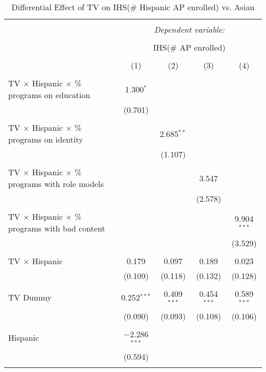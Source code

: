 
\begin{table}[!htbp] \centering 
  \caption{Differential Effect of TV on IHS(\# Hispanic AP enrolled) vs. Asian} 
  \label{} 
\begin{tabular}{@{\extracolsep{-2pt}}lcccc} 
\\[-1.8ex]\hline 
\hline \\[-1.8ex] 
 & \multicolumn{4}{c}{\textit{Dependent variable:}} \\ 
\cline{2-5} 
\\[-1.8ex] & \multicolumn{4}{c}{IHS(\# AP enrolled)} \\ 
\\[-1.8ex] & (1) & (2) & (3) & (4)\\ 
\hline \\[-1.8ex] 
 TV $\times$ Hispanic $\times$ \% programs on education & 1.300$^{*}$ &  &  &  \\ 
  & (0.701) &  &  &  \\ 
  & & & & \\ 
 TV $\times$ Hispanic $\times$ \% programs on identity &  & 2.685$^{**}$ &  &  \\ 
  &  & (1.107) &  &  \\ 
  & & & & \\ 
 TV $\times$ Hispanic $\times$ \% programs with role models &  &  & 3.547 &  \\ 
  &  &  & (2.578) &  \\ 
  & & & & \\ 
 TV $\times$ Hispanic $\times$ \% programs with bad content &  &  &  & 9.904$^{***}$ \\ 
  &  &  &  & (3.529) \\ 
  & & & & \\ 
 TV $\times$ Hispanic & 0.179 & 0.097 & 0.189 & 0.023 \\ 
  & (0.109) & (0.118) & (0.132) & (0.128) \\ 
  & & & & \\ 
 TV Dummy & 0.252$^{***}$ & 0.409$^{***}$ & 0.454$^{***}$ & 0.589$^{***}$ \\ 
  & (0.090) & (0.093) & (0.108) & (0.106) \\ 
  & & & & \\ 
 Hispanic & $-$2.286$^{***}$ &  &  &  \\ 
  & (0.594) &  &  &  \\ 
  & & & & \\ 

\end{tabular}
\end{table}
